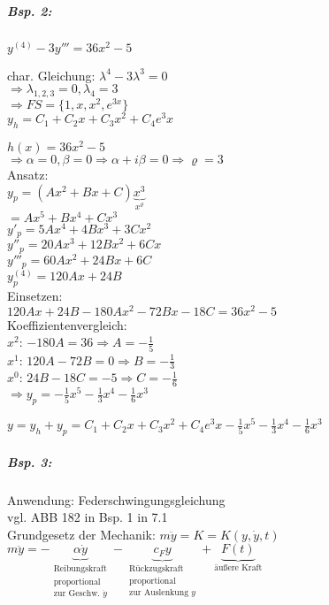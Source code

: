 \subparagraph{Bsp. 2:} $y^{(4)}-3y'''=36x^2-5$
\begin{anumerate}
\item char. Gleichung: $\lambda^4-3\lambda^3=0$\\
$\Rightarrow \lambda_{1,2,3} = 0, \lambda_4 = 3$\\
$\Rightarrow FS=\{1,x,x^2,e^{3x}\}$\\
$y_h=C_1+C_2x+C_3x^2+C_4e^3x$
\item $h(x) = 36x^2-5$\\
$\Rightarrow \alpha = 0, \beta = 0 \Rightarrow \alpha + i \beta = 0 \Rightarrow \varrho = 3$\\
Ansatz:\\
$y_p=(Ax^2+Bx+C) \underbrace{x^3}_{x^\varrho}$\\
$= A x^5 + Bx^4 + Cx^3$\\
$y'_p=5Ax^4+4Bx^3+3Cx^2$\\
$y''_p = 20 Ax^3+12Bx^2+6Cx$\\
$y'''_p = 60Ax^2+24Bx+6C$\\
$y^{(4)}_p=120Ax+24B$\\
Einsetzen:\\
$120Ax + 24B - 180 Ax^2 - 72Bx - 18 C = 36x^2-5$\\
Koeffizientenvergleich:\\
$x^2$: $-180A = 36 \Rightarrow A = - \frac{1}{5}$\\
$x^1$: $120A-72B = 0 \Rightarrow B = - \frac{1}{3}$\\
$x^0$: $24B-18C = -5 \Rightarrow C = - \frac{1}{6}$\\
$\Rightarrow y_p = -\frac{1}{5}x^5-\frac{1}{3}x^4-\frac{1}{6}x^3$
\item $y=y_h+y_p=C_1+C_2x+C_3x^2+C_4e^3x-\frac{1}{5}x^5-\frac{1}{3}x^4-\frac{1}{6}x^3$
\end{anumerate}
\subparagraph{Bsp. 3:} Anwendung: Federschwingungsgleichung\\
vgl. ABB 182 in Bsp. 1 in 7.1\\
Grundgesetz der Mechanik: $m \ddot{y}=K=K(y, \dot{y}, t)$\\
$m\ddot{y}=-\underbrace{\alpha \dot{y}}_{\substack{\text{Reibungskraft}\\ \text{proportional}\\\text{zur Geschw. }\dot{y}}}-\underbrace{c_F y}_{\substack{\text{Rückzugskraft}\\\text{proportional}\\\text{zur Auslenkung }y}}+ \underbrace{F(t)}_{\text{äußere Kraft}}$\\
